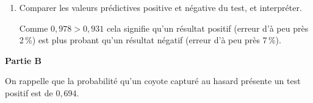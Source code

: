 \begin{enumerate}
\begin{enumerate}
Or $P\left(\overline{T} \cap \overline{M} \right) = P\left(\overline{T}\right) \times P_{\overline{T}}\left(\overline{M}\right)$ ;

$\bullet~~$$P\left(\overline{T}\right) = 1 - P(T) = 1 - 0,694 = 0,306$ ;

$\bullet~~$$P_{\overline{T}}\left(\overline{M}\right) = \dfrac{P\left(\overline{T} \cap \overline{M}\right)}{P\left(\overline{T}\right)} = \dfrac{0,3 \times 0,95}{0,306} \approx 0,9313$, soit 0,931 au millième près.
\item Comparer les valeurs prédictives positive et négative du test, et interpréter.

Comme $0,978 > 0,931$ cela signifie qu'un résultat positif (erreur d'à peu près 2\,\%) est plus probant qu'un résultat négatif (erreur d'à peu près 7\,\%).
	\end{enumerate}	
\end{enumerate}

\bigskip

\textbf{Partie B}

\medskip

On rappelle que la probabilité qu'un coyote capturé au hasard présente un test positif est de $0,694$.

\medskip

